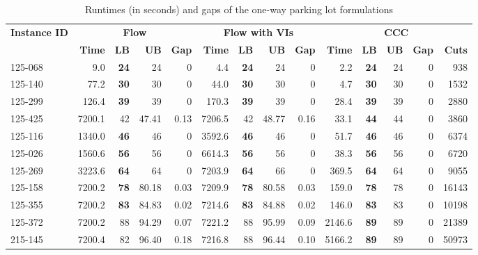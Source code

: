 \documentclass[10pt]{article}
\theoremstyle{definition}
\begin{document}
\begin{table}[H]
\small
  \centering
  \caption{Runtimes (in seconds) and gaps of the one-way parking lot formulations}
    \begin{tabular}{l|rrrr|rrrr|rrrrr}
    \hline
    \multirow{2}[4]{*}{\textbf{Instance ID}} & \multicolumn{4}{c|}{\textbf{Flow }} & \multicolumn{4}{c|}{\textbf{Flow  with VIs}} & \multicolumn{5}{c}{\textbf{CCC}} \\
\cline{2-14}          & \textbf{Time} & \textbf{LB} & \textbf{UB} & \textbf{Gap} & \textbf{Time} & \textbf{LB} & \textbf{UB} & \textbf{Gap} & \textbf{Time} & \textbf{LB} & \textbf{UB} & \textbf{Gap} & \textbf{Cuts} \\
        \hline
    125-068 & 9.0   & \textbf{24} & 24    & 0     & 4.4   & \textbf{24} & 24    & 0     & 2.2   & \textbf{24} & 24    & 0     & 938  \\
    125-140 & 77.2  & \textbf{30} & 30    & 0     & 44.0  & \textbf{30} & 30    & 0     & 4.7   & \textbf{30} & 30    & 0     & 1532 \\
    125-299 & 126.4 & \textbf{39} & 39    & 0     & 170.3 & \textbf{39} & 39    & 0     & 28.4  & \textbf{39} & 39    & 0     & 2880 \\
    125-425 & 7200.1 & 42    & 47.41 & 0.13  & 7206.5 & 42    & 48.77 & 0.16  & 33.1  & \textbf{44} & 44    & 0     & 3860 \\
    125-116 & 1340.0 & \textbf{46} & 46    & 0     & 3592.6 & \textbf{46} & 46    & 0     & 51.7  & \textbf{46} & 46    & 0     & 6374 \\
    125-026 & 1560.6 & \textbf{56} & 56    & 0     & 6614.3 & \textbf{56} & 56    & 0     & 38.3  & \textbf{56} & 56    & 0     & 6720 \\
    125-269 & 3223.6 & \textbf{64} & 64    & 0     & 7203.9 & \textbf{64} & 66    & 0     & 369.5 & \textbf{64} & 64    & 0     & 9055 \\
    125-158 & 7200.2 & \textbf{78} & 80.18 & 0.03  & 7209.9 & \textbf{78} & 80.58 & 0.03  & 159.0 & \textbf{78} & 78    & 0     & 16143 \\
    125-355 & 7200.2 & \textbf{83} & 84.83 & 0.02  & 7214.6 & \textbf{83} & 84.88 & 0.02  & 146.0 & \textbf{83} & 83    & 0     & 10198 \\
    125-372 & 7200.2 & 88    & 94.29 & 0.07  & 7221.2 & 88    & 95.99 & 0.09  & 2146.6 & \textbf{89} & 89    & 0     & 21389 \\
    215-145 & 7200.4 & 82    & 96.40 & 0.18  & 7216.8 & 88    & 96.44 & 0.10  & 5166.2 & \textbf{89} & 89    & 0     & 50973 \\

\end{tabular}
\end{table}
\end{document}
